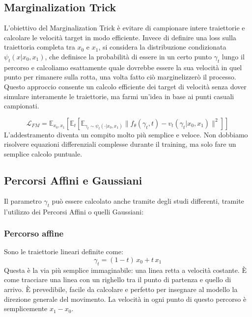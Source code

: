 \subsection{Marginalization Trick}

L’obiettivo del Marginalization Trick è evitare di campionare intere traiettorie e calcolare le velocità target in modo efficiente. Invece di definire una loss sulla traiettoria completa tra $x_0$ e $x_1$, si considera la distribuzione condizionata $\psi_t(x | x_0, x_1)$, che definisce la probabilità di essere in un certo punto $\gamma_t$ lungo il percorso e calcoliamo esattamente quale dovrebbe essere la sua velocità in quel punto per rimanere sulla rotta, una volta fatto ciò marginelizzerò il processo. Questo approccio consente un calcolo efficiente dei target di velocità senza dover simulare interamente le traiettorie, ma farmi un'idea in base ai punti casuali campionati.

\begin{equation}
    \mathcal{L}_{FM} =\mathbb{E}_{x_0,x_1}\left[\mathbb{E}_t\left[\mathbb{E}_{\gamma_t\sim\psi_t(\cdot|x_0,x_1)}\|f_\theta(\gamma_t,t) - v_t(\gamma_t|x_0,x_1)\|^2\right]\right]
\end{equation}
L'addestramento diventa un compito molto più semplice e veloce. Non dobbiamo risolvere equazioni differenziali complesse durante il training, ma solo fare un semplice calcolo puntuale.

\subsection{Percorsi Affini e Gaussiani}
Il parametro $\gamma_t$ può essere calcolato anche tramite degli studi differenti, tramite l'utilizzo dei Percorsi Affini o quelli Gaussiani:

\subsubsection{Percorso affine}
Sono le traiettorie lineari definite come:
\begin{equation}
    \gamma_t = (1-t)\,x_0 + t\,x_1
\end{equation}
Questa è la via più semplice immaginabile: una linea retta a velocità costante. È come tracciare una linea con un righello tra il punto di partenza e quello di arrivo. È prevedibile, facile da calcolare e perfetto per insegnare al modello la direzione generale del movimento. La velocità in ogni punto di questo percorso è semplicemente $x_1-x_0$.

